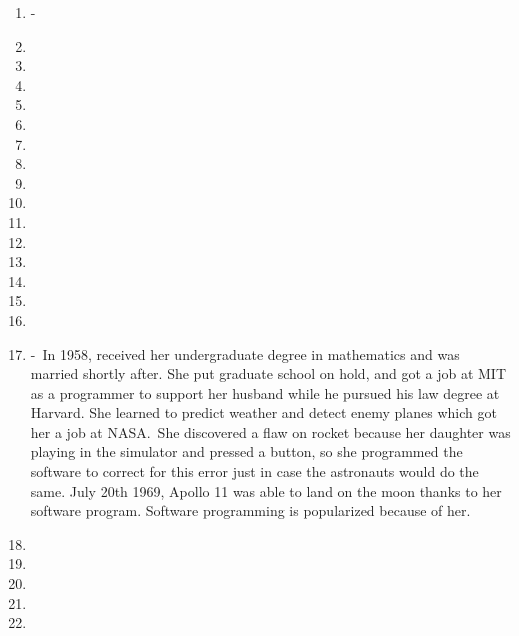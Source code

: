 \documentclass[12pt,a4paper]{article}
\begin{document}
\begin{enumerate}
  \item {} -\ 
  \item {}
  \item {}
  \item {}
  \item {}
  \item {}
  \item {}
  \item {}
  \item {}
  \item {}
  \item {}
  \item {}
  \item {}
  \item {}
  \item {}
  \item {}
  \item {} -\ In 1958, received her undergraduate degree in mathematics and was married shortly after. She put graduate school on hold, and got a job at MIT as a programmer to support her husband while he pursued his law degree at Harvard. She learned to predict weather and detect enemy planes which got her a job at NASA.\ She discovered a flaw on rocket because her daughter was playing in the simulator and pressed a button, so she programmed the software to correct for this error just in case the astronauts would do the same. July 20th 1969, Apollo 11 was able to land on the moon thanks to her software program. Software programming is popularized because of her. 
  \item {}
  \item {}
  \item {}
  \item {}
  \item {}

\end{enumerate}
\end{document}
